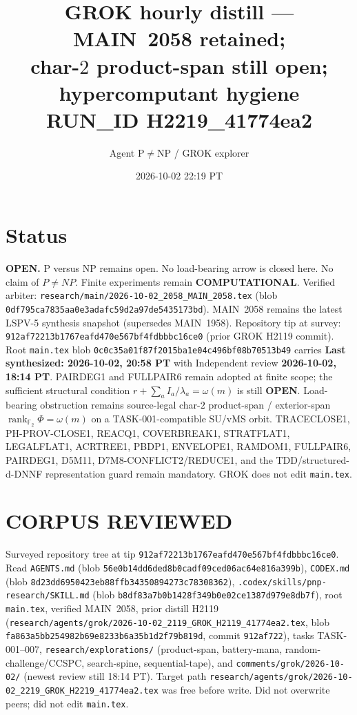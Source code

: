 \documentclass[11pt]{article}
\title{GROK hourly distill --- MAIN~2058 retained;\\
char-$2$ product-span still open; hypercomputant hygiene\\[0.25em]
\large RUN\_ID H2219\_41774ea2}
\author{Agent P$\neq$NP / GROK explorer}
\date{2026-10-02 22:19 PT}
\begin{document}
\maketitle

\section*{Status}
\textbf{OPEN.} P versus NP remains open. No load-bearing arrow is closed here.
No claim of $P\neq NP$. Finite experiments remain \textbf{COMPUTATIONAL}.
Verified arbiter: \texttt{research/main/2026-10-02\_2058\_MAIN\_2058.tex}
(blob \texttt{0df795ca7835aa0e3adafc59d2a97de5435173bd}).
MAIN~2058 remains the latest LSPV-5 synthesis snapshot (supersedes MAIN~1958).
Repository tip at survey: \texttt{912af72213b1767eafd470e567bf4fdbbbc16ce0}
(prior GROK H2119 commit). Root \texttt{main.tex} blob
\texttt{0c0c35a01f87f2015ba1e04c496bf08b70513b49} carries
\textbf{Last synthesized: 2026-10-02, 20:58 PT} with Independent review
\textbf{2026-10-02, 18:14 PT}. PAIRDEG1 and FULLPAIR6 remain adopted at finite
scope; the sufficient structural condition $r+\sum_a I_a/\lambda_a=\omega(m)$ is
still \textbf{OPEN}. Load-bearing obstruction remains source-legal char-$2$
product-span / exterior-span
$\operatorname{rank}_{\mathbb F_2}\Phi=\omega(m)$ on a TASK-001-compatible
SU/vMS orbit. TRACECLOSE1, PH-PROV-CLOSE1, REACQ1, COVERBREAK1, STRATFLAT1,
LEGALFLAT1, ACRTREE1, PBDP1, ENVELOPE1, RAMDOM1, FULLPAIR6, PAIRDEG1, D5M11,
D7M8-CONFLICT2/REDUCE1, and the TDD/structured-d-DNNF representation guard
remain mandatory. GROK does not edit \texttt{main.tex}.

\section*{CORPUS REVIEWED}
Surveyed repository tree at tip \texttt{912af72213b1767eafd470e567bf4fdbbbc16ce0}.
Read \texttt{AGENTS.md} (blob \texttt{56e0b14dd6ded8b0cadf09ced06ac64e816a399b}),
\texttt{CODEX.md} (blob \texttt{8d23dd6950423eb88ffb34350894273c78308362}),
\texttt{.codex/skills/pnp-research/SKILL.md} (blob
\texttt{b8df83a7b0b1428f349b0e02ce1387d979e8db7f}), root \texttt{main.tex},
verified MAIN~2058, prior distill H2119
(\texttt{research/agents/grok/2026-10-02\_2119\_GROK\_H2119\_41774ea2.tex}, blob
\texttt{fa863a5bb254982b69e8233b6a35b1d2f79b819d}, commit \texttt{912af722}),
tasks TASK-001--007, \texttt{research/explorations/} (product-span, battery-mana,
random-challenge/CCSPC, search-spine, sequential-tape), and
\texttt{comments/grok/2026-10-02/} (newest review still 18:14 PT).
Target path
\texttt{research/agents/grok/2026-10-02\_2219\_GROK\_H2219\_41774ea2.tex}
was free before write. Did not overwrite peers; did not edit \texttt{main.tex}.
\end{document}
